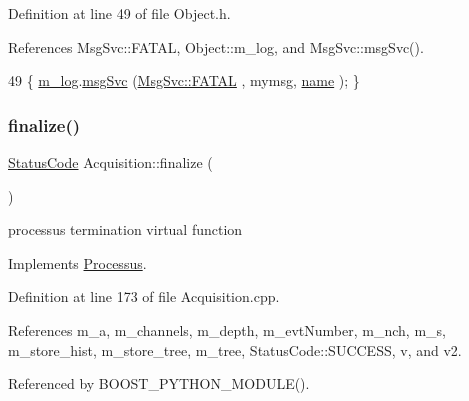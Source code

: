 Definition at line 49 of file Object.\+h.



References Msg\+Svc\+::\+F\+A\+T\+AL, Object\+::m\+\_\+log, and Msg\+Svc\+::msg\+Svc().


\begin{DoxyCode}
49 \{ \hyperlink{classObject_a0d269813dd7ac1f24bc143031e2963f2}{m\_log}.\hyperlink{classMsgSvc_ad25f18047920cc59a314e5098259711c}{msgSvc} (\hyperlink{classMsgSvc_ae671eb7301996cd049d2da8a65925926a59c73cb29edfc9cdf35845e2b1301363}{MsgSvc::FATAL}   , mymsg, \hyperlink{classObject_a300f4c05dd468c7bb8b3c968868443c1}{name} ); \}
\end{DoxyCode}
\mbox{\label{classAcquisition_ab8ffcd86548280f0403b3ae6338f2499}} 
\subsubsection{\texorpdfstring{finalize()}{finalize()}}
{\footnotesize\ttfamily \hyperlink{classStatusCode}{Status\+Code} Acquisition\+::finalize (\begin{DoxyParamCaption}{ }\end{DoxyParamCaption})\hspace{0.3cm}{\ttfamily [virtual]}}

processus termination virtual function 

Implements \hyperlink{classProcessus_aba93d691f031bdb18ae4b8afb1b2e856}{Processus}.



Definition at line 173 of file Acquisition.\+cpp.



References m\+\_\+a, m\+\_\+channels, m\+\_\+depth, m\+\_\+evt\+Number, m\+\_\+nch, m\+\_\+s, m\+\_\+store\+\_\+hist, m\+\_\+store\+\_\+tree, m\+\_\+tree, Status\+Code\+::\+S\+U\+C\+C\+E\+SS, v, and v2.



Referenced by B\+O\+O\+S\+T\+\_\+\+P\+Y\+T\+H\+O\+N\+\_\+\+M\+O\+D\+U\+L\+E().


